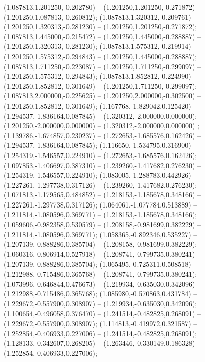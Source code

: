  (1.087813,1.201250,-0.202780) -- (1.201250,1.201250,-0.271872) -- (1.201250,1.087813,-0.260812);
 (1.087813,1.320312,-0.209761) -- (1.201250,1.320313,-0.281230) -- (1.201250,1.201250,-0.271872);
 (1.087813,1.445000,-0.215472) -- (1.201250,1.445000,-0.288887) -- (1.201250,1.320313,-0.281230);
 (1.087813,1.575312,-0.219914) -- (1.201250,1.575312,-0.294843) -- (1.201250,1.445000,-0.288887);
 (1.087813,1.711250,-0.223087) -- (1.201250,1.711250,-0.299097) -- (1.201250,1.575312,-0.294843);
 (1.087813,1.852812,-0.224990) -- (1.201250,1.852812,-0.301649) -- (1.201250,1.711250,-0.299097);
 (1.087813,2.000000,-0.225625) -- (1.201250,2.000000,-0.302500) -- (1.201250,1.852812,-0.301649);
 (1.167768,-1.829042,0.125420) -- (1.294537,-1.836164,0.087845) -- (1.320312,-2.000000,0.000000);
 (1.201250,-2.000000,0.000000) -- (1.320312,-2.000000,0.000000) ;
 (1.139786,-1.674857,0.230237) -- (1.272653,-1.685576,0.162426) -- (1.294537,-1.836164,0.087845);
 (1.116650,-1.534795,0.316900) -- (1.254319,-1.546557,0.224910) -- (1.272653,-1.685576,0.162426);
 (1.097853,-1.406697,0.387310) -- (1.239260,-1.417682,0.276230) -- (1.254319,-1.546557,0.224910);
 (1.083005,-1.288783,0.442926) -- (1.227261,-1.297738,0.317126) -- (1.239260,-1.417682,0.276230);
 (1.071813,-1.179565,0.484852) -- (1.218153,-1.185678,0.348166) -- (1.227261,-1.297738,0.317126);
 (1.064061,-1.077784,0.513889) -- (1.211814,-1.080596,0.369771) -- (1.218153,-1.185678,0.348166);
 (1.059606,-0.982358,0.530579) -- (1.208158,-0.981699,0.382229) -- (1.211814,-1.080596,0.369771);
 (1.058365,-0.892346,0.535227) -- (1.207139,-0.888286,0.385704) -- (1.208158,-0.981699,0.382229);
 (1.060316,-0.806914,0.527918) -- (1.208741,-0.799735,0.380241) -- (1.207139,-0.888286,0.385704);
 (1.065495,-0.725311,0.508518) -- (1.212988,-0.715486,0.365768) -- (1.208741,-0.799735,0.380241);
 (1.073996,-0.646844,0.476673) -- (1.219934,-0.635030,0.342096) -- (1.212988,-0.715486,0.365768);
 (1.085980,-0.570863,0.431784) -- (1.229672,-0.557900,0.308907) -- (1.219934,-0.635030,0.342096);
 (1.100654,-0.496058,0.376470) -- (1.241514,-0.482825,0.268091) -- (1.229672,-0.557900,0.308907);
 (1.114813,-0.419972,0.321587) -- (1.252854,-0.406933,0.227006) -- (1.241514,-0.482825,0.268091);
 (1.128133,-0.342607,0.268205) -- (1.263446,-0.330149,0.186328) -- (1.252854,-0.406933,0.227006);
